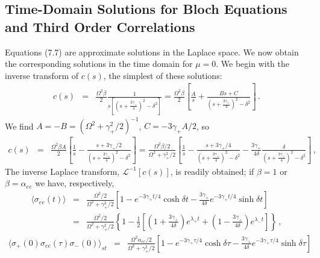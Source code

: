 \documentclass[twocolumn,aps,eqsecnum,showkeys,amsmath]{revtex4-2}
\begin{document}
\begin{widetext}
\subsection{Time-Domain Solutions for Bloch Equations and Third Order 
Correlations} %
Equations (7.7) are approximate solutions in the Laplace space. We 
now obtain the corresponding solutions in the time domain for $\mu=0$. 
We begin with the inverse transform of $c(s)$, the simplest of these solutions:  
%
\begin{eqnarray*} 	
c(s) &=& \frac{\Omega^2 \beta}{2} \frac{1}{s \left[ \left( s +\frac{3 \gamma_+}{4} 
	\right)^2 - \delta^2  \right]}	
	= \frac{\Omega^2 \beta}{2} \left[ \frac{A}{s} 
	+\frac{Bs +C}{ \left( s +\frac{3 \gamma_+}{4} \right)^2 - \delta^2 } \right]  \,.
\end{eqnarray*}
We find $A =-B =(\Omega^2 +\gamma_+^2/2)^{-1}$, $C =-3 \gamma_+ A/2$, so 
%
\begin{eqnarray} 	
c(s) &=& \frac{\Omega^2 \beta A}{2} \left[ \frac{1}{s} 
	-\frac{s +3 \gamma_+/2}
	{ \left( s +\frac{3 \gamma_+}{4} \right)^2 - \delta^2 } \right]  
	= \frac{\Omega^2 \beta/2}{\Omega^2 +\gamma_+^2/2} \left[ \frac{1}{s} 
	-\frac{s +3 \gamma_+/4}
	{ \left( s +\frac{3 \gamma_+}{4} \right)^2 - \delta^2 } 
	 -\frac{3 \gamma_+}{4 \delta} \frac{\delta}
	{ \left( s +\frac{3 \gamma_+}{4} \right)^2 - \delta^2 }  \right]  \,, \qquad
\end{eqnarray}
The inverse Laplace transform, $\mathcal{L}^{-1} [c(s)]$, is readily 
obtained; if $\beta=1$ or $\beta= \alpha_{ee}$ we have, respectively, 
%
\begin{eqnarray} 	
\langle \sigma_{ee} (t) \rangle 
&=& \frac{\Omega^2/2}{\Omega^2 +\gamma_+^2/2} 
	\left[ 1 -e^{-3\gamma_+ t/4} \cosh{\delta t} 
	-\frac{3 \gamma_+}{4 \delta} e^{-3\gamma_+ t/4} \sinh{\delta t}  
	 \right] 	\nonumber \\  
	&=& \frac{\Omega^2/2}{\Omega^2 +\gamma_+^2/2} \left\{ 1 
	-\frac{1}{2} \left[ \left( 1+\frac{3 \gamma_+}{4 \delta} \right) e^{\lambda_+ t}  	
	+ \left( 1-\frac{3 \gamma_+}{4 \delta} \right) e^{\lambda_- t} 
	 \right] \right\} 	\,,  
\end{eqnarray}
%
\begin{eqnarray} 	\label{eq:G2shelving}
\langle \sigma_+ (0) \sigma_{ee} (\tau) \sigma_-(0) \rangle_{st} 
&=& \frac{\Omega^2 \alpha_{ee}/2}{\Omega^2 +\gamma_+^2/2} 
	\left[ 1 -e^{-3\gamma_+ \tau/4} \cosh{\delta \tau} 
	-\frac{3 \gamma_+}{4 \delta} e^{-3\gamma_+ \tau/4} \sinh{\delta \tau}  
	 \right] 	\nonumber \\  

\end{eqnarray}
\end{widetext}
\end{document}
